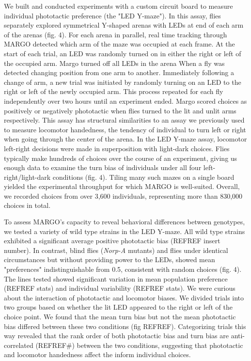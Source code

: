 \documentclass[10pt]{article}
\begin{document}
\begin{multicols}{2}
We built and conducted experiments with a custom circuit board to measure individual phototactic preference (the "LED Y-maze"). In this assay, flies separately explored symmetrical Y-shaped arenas with LEDs at end of each arm of the arenas (fig. 4). For each arena in parallel, real time tracking through MARGO detected which arm of the maze was occupied at each frame. At the start of each trial, an LED was randomly turned on in either the right or left  of the occupied arm. Margo turned off all LEDs in the arena When a fly was detected changing position from one arm to another. Immediately following a change of arm, a new trial was initiated by randomly turning on an LED to the right or left of the newly occupied arm. This process repeated for each fly independently over two hours until an experiment ended. Margo scored choices as positively or negatively phototactic when flies turned to the lit and unlit arms respectively. This assay has structural similarities to an assay we previously used to measure locomotor handedness, the tendency of individual to turn left or right when going through the center of the arena. In the LED Y-maze assay, locomotor left-right decisions were made in superposition with light-dark choices. Flies typically make hundreds of choices over the course of an experiment, giving us enough data to examine the turn bias of individuals under all four left-right/light-dark conditions (fig. 4). Tiling many such mazes on a single board yielded the experimental throughput for which MARGO is well-suited. Overall, we recorded choices from over 3,600 individuals, representing more than 830,000 choices in total.

To assess MARGO's capacity to reveal behavioral differences between genotypes, we tested a variety of wild type strains in the LED Y-maze. All wild type strains exhibited a significant average positive phototactic bias (REFREF insert number). In contrast, blind flies (\emph{Norp-A} mutants) and flies under identical circumstances but without providing power to the LEDs, showed mean "preferences" indistinguishable from 0.5, consistent with random choices (fig. 4). The lines tested showed significant variation in mean population preference (REFREF stats) and individual variability (REFREF stats). We were curious about the interaction of phototactic and locomotor biases. We divided trials into two groups based on whether the lit LED appeared to the right or left of the choice point. We found that the mean turn bias but not the mean phototactic bias differed between these two conditions (fig REFREF). Categorizing trials this way revealed that the rank order of both phototactic bias and turn bias are anti-correlated (REFREF#) between the two conditions, suggesting that phototactic and locomotor handedness affect the inform individual choices. 


\end{multicols}
\end{document}
